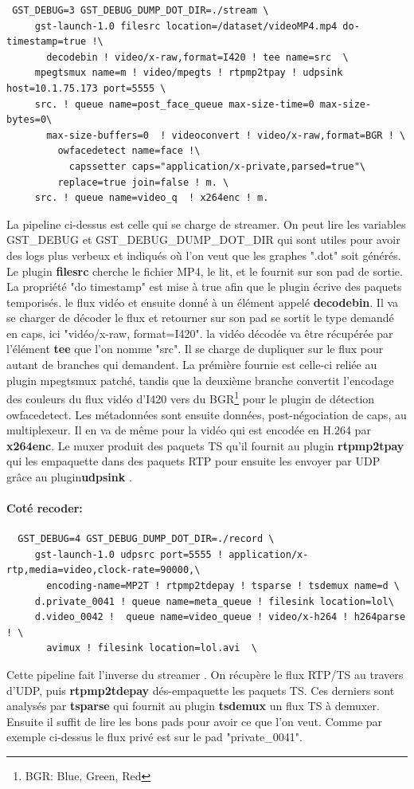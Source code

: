 \begin{verbatim}
 GST_DEBUG=3 GST_DEBUG_DUMP_DOT_DIR=./stream \
	 gst-launch-1.0 filesrc location=/dataset/videoMP4.mp4 do-timestamp=true !\
	   decodebin ! video/x-raw,format=I420 ! tee name=src  \
	 mpegtsmux name=m ! video/mpegts ! rtpmp2tpay ! udpsink host=10.1.75.173 port=5555 \
	 src. ! queue name=post_face_queue max-size-time=0 max-size-bytes=0\
	   max-size-buffers=0  ! videoconvert ! video/x-raw,format=BGR ! \
	     owfacedetect name=face !\
	       capssetter caps="application/x-private,parsed=true"\
		 replace=true join=false ! m. \
	 src. ! queue name=video_q  ! x264enc ! m.
\end{verbatim}
La pipeline ci-dessus est celle qui se charge de streamer. On peut lire les variables GST\_DEBUG et GST\_DEBUG\_DUMP\_DOT\_DIR qui sont utiles pour avoir des logs plus verbeux et indiqués où l'on veut que les graphes ".dot" soit générés. Le plugin \textbf{filesrc} cherche le fichier MP4, le lit, et le fournit sur son pad de sortie. La propriété "do timestamp" est mise à true afin que le plugin écrive des paquets temporisés. le flux vidéo et ensuite donné à un élément appelé \textbf{decodebin}. Il va se charger de décoder le flux et retourner sur son pad se sortit le type demandé en caps, ici "vidéo/x-raw, format=I420". la vidéo décodée va être récupérée par l'élément \textbf{tee} que l'on nomme "src". Il se charge de dupliquer sur le flux pour autant de branches qui demandent. La prémière fournie est celle-ci reliée au plugin mpegtsmux patché, tandis que la deuxième branche convertit l'encodage des couleurs du flux vidéo d'I420 vers du BGR\footnote{BGR: Blue, Green, Red} pour le plugin de détection owfacedetect. Les métadonnées sont ensuite données, post-négociation de caps, au multiplexeur. Il en va de même pour la vidéo qui est encodée en H.264 par \textbf{x264enc}. Le muxer produit des paquets TS qu'il fournit au plugin \textbf{rtpmp2tpay} qui les empaquette dans des paquets RTP pour ensuite les envoyer par UDP grâce au plugin\textbf{udpsink} .


\paragraph{Coté recoder: }

\begin{verbatim}
  GST_DEBUG=4 GST_DEBUG_DUMP_DOT_DIR=./record \
	 gst-launch-1.0 udpsrc port=5555 ! application/x-rtp,media=video,clock-rate=90000,\
	   encoding-name=MP2T ! rtpmp2tdepay ! tsparse ! tsdemux name=d \
	 d.private_0041 ! queue name=meta_queue ! filesink location=lol\
	 d.video_0042 !  queue name=video_queue ! video/x-h264 ! h264parse ! \
	   avimux ! filesink location=lol.avi  \
\end{verbatim}
Cette pipeline fait l'inverse du streamer . On récupère le flux RTP/TS au travers d'UDP, puis \textbf{rtpmp2tdepay} dés-empaquette les paquets TS. Ces derniers sont analysés par \textbf{tsparse} qui fournit au plugin \textbf{tsdemux} un flux TS à demuxer. Ensuite il suffit de lire les bons pads pour avoir ce que l'on veut. Comme par exemple ci-dessus le flux privé est sur le pad "private\_0041".


